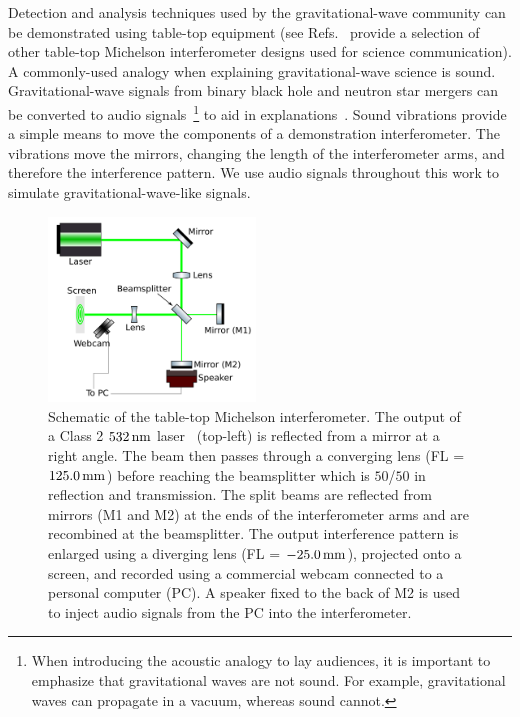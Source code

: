 \documentclass[paper-main.tex]{subfiles}
\begin{document}
Detection and analysis techniques used by the gravitational-wave community can be demonstrated using table-top equipment (see Refs.~\cite{TTExhibit:2020,TTExhibit:online,AMIGO:online,ThorLabsIFO,LIGOIFOGlue,LIGOIFOMagnets,FoxEtAl:1999} provide a selection of other table-top Michelson interferometer designs used for science communication).
A commonly-used analogy when explaining gravitational-wave science is sound. 
Gravitational-wave signals from binary black hole and neutron star mergers can be converted to audio signals~\footnote{When introducing the acoustic analogy to lay audiences, it is important to emphasize that gravitational waves are not sound. For example, gravitational waves can propagate in a vacuum, whereas sound cannot.} to aid in explanations~\cite{SoundsOfSpaceTime:online,BlackHoleHunter:online}.
Sound vibrations provide a simple means to move the components of a demonstration interferometer. 
The vibrations move the mirrors, changing the length of the interferometer arms, and therefore the interference pattern.
We use audio signals throughout this work to simulate gravitational-wave-like signals.


\begin{figure}
	\includegraphics[width=0.49\textwidth]{figures/ifo_schematic_webcam_edit.pdf}
	\caption{\label{fig:ifo_schematic_webcam}
Schematic of the table-top Michelson interferometer. 
The output of a Class 2 $532\,{\rm nm}$ laser~\cite{ThorLabsIFO} (top-left) is reflected from a mirror at a right angle. The beam then passes through a converging lens (FL = $125.0\,{\rm mm}$) before reaching the beamsplitter which is $50$/$50$ in reflection and transmission. 
The split beams are reflected from mirrors (M1 and M2) at the ends of the interferometer arms and are recombined at the beamsplitter. 
The output interference pattern is enlarged using a diverging lens (FL = $-25.0\,{\rm mm}$), projected onto a screen, and recorded using a commercial webcam connected to a personal computer (PC). 
A speaker fixed to the back of M2 is used to inject audio signals from the PC into the interferometer.
    }
\end{figure}
\end{document}
